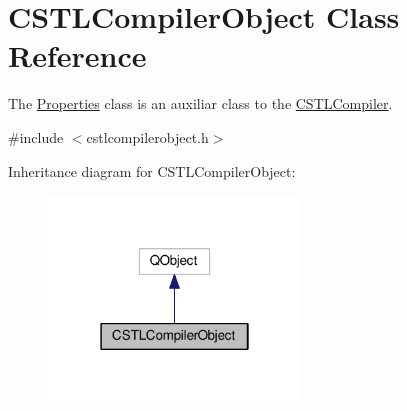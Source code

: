 \hypertarget{class_c_s_t_l_compiler_object}{}\section{C\+S\+T\+L\+Compiler\+Object Class Reference}
\label{class_c_s_t_l_compiler_object}


The \hyperlink{class_properties}{Properties} class is an auxiliar class to the \hyperlink{class_c_s_t_l_compiler}{C\+S\+T\+L\+Compiler}.  




{\ttfamily \#include $<$cstlcompilerobject.\+h$>$}



Inheritance diagram for C\+S\+T\+L\+Compiler\+Object\+:\nopagebreak
\begin{figure}[H]
\begin{center}
\leavevmode
\includegraphics[width=190pt]{class_c_s_t_l_compiler_object__inherit__graph}
\end{center}
\end{figure}
